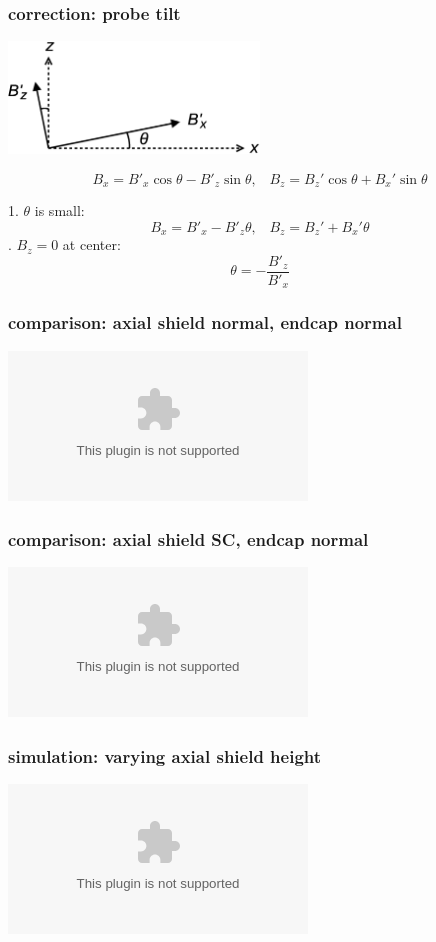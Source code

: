 \documentclass{beamer}
\newcommand{\pyplot}{\includegraphics[width=\textwidth, trim=60px 60px 60px 40px]}
\begin{document}
\begin{frame}
\frametitle{correction: probe tilt}
    
    \begin{center}
        \includegraphics[width=0.5\textwidth]{figures/probe_tilt.eps}
    \end{center} \pause
    \begin{equation}
        B_x = B'_x \cos\theta - B'_z \sin\theta, \;\;\; B_z = B_z' \cos\theta + B_x' \sin\theta
    \end{equation}

    \pause

    \bigskip

    1. $\theta$ is small: \pause
    \begin{equation*}
        B_x = B'_x - B'_z \theta, \;\;\; B_z = B_z' + B_x' \theta
    \end{equation*} . $B_z = 0$ at center: \pause
    \begin{equation*}
        \theta = -\frac{B'_z}{B'_x}
    \end{equation*}

\end{frame}

\begin{frame}
\frametitle{comparison: axial shield normal, endcap normal}

    \begin{center}
        \pyplot{figures/normnorm_comp.eps}
    \end{center}
    
\end{frame}

\begin{frame}
\frametitle{comparison: axial shield SC, endcap normal}

    \begin{center}
        \pyplot{figures/SCnorm_comp_new.eps}
    \end{center}
    
\end{frame}

\begin{frame}
\frametitle{simulation: varying axial shield height}

    \begin{center}
        \pyplot{figures/axial_effect.eps}
    \end{center}

\end{frame}
\end{document}
